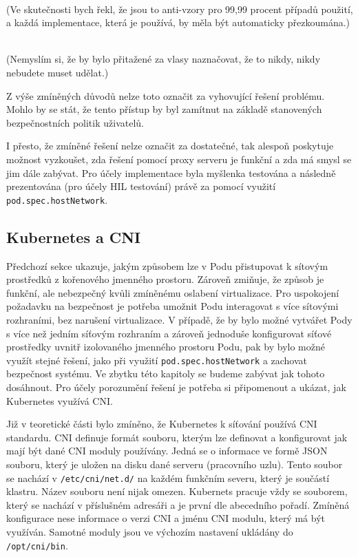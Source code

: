 \begin{displayquote}
\\(Ve skutečnosti bych řekl, že jsou to anti-vzory pro 99,99 procent případů použití, a každá implementace, která je používá, by měla být automaticky přezkoumána.)\cite{betz_2022_understanding} 

\\(Nemyslím si, že by bylo přitažené za vlasy naznačovat, že to nikdy, nikdy nebudete muset udělat.)\cite{betz_2022_understanding} 
\end{displayquote}


Z výše zmíněných důvodů nelze toto označit za vyhovující řešení problému. Mohlo by se stát, že tento přístup by byl zamítnut na základě stanovených bezpečnostních politik uživatelů.

I přesto, že zmíněné řešení nelze označit za dostatečné, tak alespoň poskytuje možnost vyzkoušet, zda řešení pomocí proxy serveru je funkční a zda má smysl se jim dále zabývat. Pro účely implementace byla myšlenka testována a následně prezentována (pro účely HIL testování) právě za pomocí využití \verb|pod.spec.hostNetwork|.

\subsection{Kubernetes a CNI}
Předchozí sekce ukazuje, jakým způsobem lze v Podu přistupovat k sítovým prostředků z kořenového jmenného prostoru. Zároveň zmiňuje, že způsob je funkční, ale nebezpečný kvůli zmíněnému oslabení virtualizace. Pro uspokojení požadavku na bezpečnost je potřeba umožnit Podu interagovat s více sítovými rozhraními, bez narušení virtualizace. V případě, že by bylo možné vytvářet Pody s více než jedním síťovým rozhraním a zároveň jednoduše konfigurovat síťové prostředky uvnitř izolovaného jmenného prostoru Podu, pak by bylo možné využít stejné řešení, jako při využití \verb|pod.spec.hostNetwork| a zachovat bezpečnost systému. Ve zbytku této kapitoly se budeme zabývat jak tohoto dosáhnout. Pro účely porozumění řešení je potřeba si připomenout a ukázat, jak Kubernetes využívá CNI.

Již v teoretické části bylo zmíněno, že Kubernetes k síťování používá CNI standardu. CNI definuje formát souboru, kterým lze definovat a konfigurovat jak mají být dané CNI moduly používány. Jedná se o informace ve formě JSON souboru, který je uložen na disku dané serveru (pracovního uzlu). Tento soubor se nachází v \verb|/etc/cni/net.d/| na každém funkčním severu, který je součástí klastru. Název souboru není nijak omezen. Kubernets pracuje vždy se souborem, který se nachází v příslušném adresáři a je první dle abecedního pořadí. Zmíněná konfigurace nese informace o verzi CNI a jménu CNI modulu, který má být využíván. Samotné moduly jsou ve výchozím nastavení ukládány do \verb|/opt/cni/bin|. 

